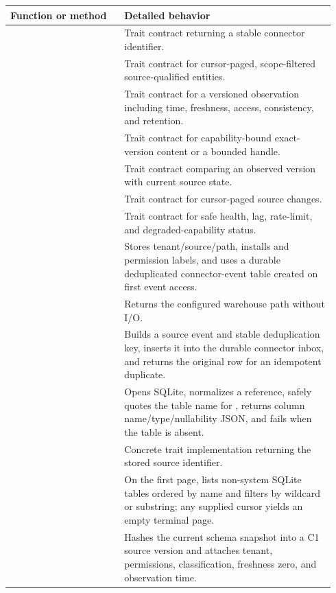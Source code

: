 \begin{longtable}{L{0.33\linewidth}L{0.61\linewidth}}
\toprule
\textbf{Function or method} & \textbf{Detailed behavior} \\
\midrule
\endhead
{} & Trait contract returning a stable connector identifier. \\
 & Trait contract for cursor-paged, scope-filtered source-qualified entities. \\
 & Trait contract for a versioned observation including time, freshness, access, consistency, and retention. \\
 & Trait contract for capability-bound exact-version content or a bounded handle. \\
 & Trait contract comparing an observed version with current source state. \\
 & Trait contract for cursor-paged source changes. \\
 & Trait contract for safe health, lag, rate-limit, and degraded-capability status. \\
 & Stores tenant/source/path, installs  and  permission labels, and uses a durable deduplicated connector-event table created on first event access. \\
 & Returns the configured warehouse path without I/O. \\
 & Builds a source event and stable deduplication key, inserts it into the durable connector inbox, and returns the original row for an idempotent duplicate. \\
 & Opens SQLite, normalizes a  reference, safely quotes the table name for , returns column name/type/nullability JSON, and fails when the table is absent. \\
 & Concrete trait implementation returning the stored source identifier. \\
 & On the first page, lists non-system SQLite tables ordered by name and filters by wildcard or substring; any supplied cursor yields an empty terminal page. \\
 & Hashes the current schema snapshot into a C1 source version and attaches tenant, permissions, classification, freshness zero, and observation time. \\

\end{longtable}
